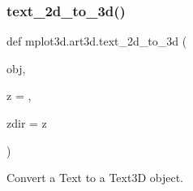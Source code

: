 \subsubsection{\texorpdfstring{text\+\_\+2d\+\_\+to\+\_\+3d()}{text\_2d\_to\_3d()}}
{\footnotesize\ttfamily def mplot3d.\+art3d.\+text\+\_\+2d\+\_\+to\+\_\+3d (\begin{DoxyParamCaption}\item[{}]{obj,  }\item[{}]{z = {},  }\item[{}]{zdir = {\ttfamily \textquotesingle{}z\textquotesingle{}} }\end{DoxyParamCaption})}

\begin{DoxyVerb}Convert a Text to a Text3D object.\end{DoxyVerb}
 